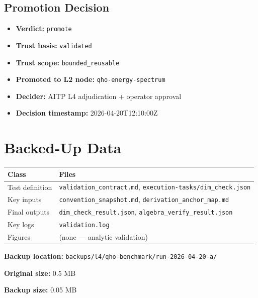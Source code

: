 \documentclass[11pt,a4paper]{article}
\begin{document}
\subsection{Promotion Decision}

\begin{itemize}
  \item \textbf{Verdict:} \texttt{promote}
  \item \textbf{Trust basis:} \texttt{validated}
  \item \textbf{Trust scope:} \texttt{bounded\_reusable}
  \item \textbf{Promoted to L2 node:} \texttt{qho-energy-spectrum}
  \item \textbf{Decider:} AITP L4 adjudication + operator approval
  \item \textbf{Decision timestamp:} 2026-04-20T12:10:00Z
\end{itemize}

\section{Backed-Up Data}

\begin{infobox}
\begin{tabularx}{\linewidth}{@{}>{\raggedright\arraybackslash}p{3.5cm} >{\raggedright\arraybackslash}X@{}}
\toprule
\textbf{Class} & \textbf{Files} \\
\midrule
Test definition  & \texttt{validation\_contract.md}, \texttt{execution-tasks/dim\_check.json} \\
Key inputs       & \texttt{convention\_snapshot.md}, \texttt{derivation\_anchor\_map.md} \\
Final outputs    & \texttt{dim\_check\_result.json}, \texttt{algebra\_verify\_result.json} \\
Key logs         & \texttt{validation.log} \\
Figures          & (none — analytic validation) \\
\bottomrule
\end{tabularx}
\end{infobox}

\noindent\textbf{Backup location:} \texttt{backups/l4/qho-benchmark/run-2026-04-20-a/}

\noindent\textbf{Original size:} 0.5 MB

\noindent\textbf{Backup size:} 0.05 MB
\end{document}

